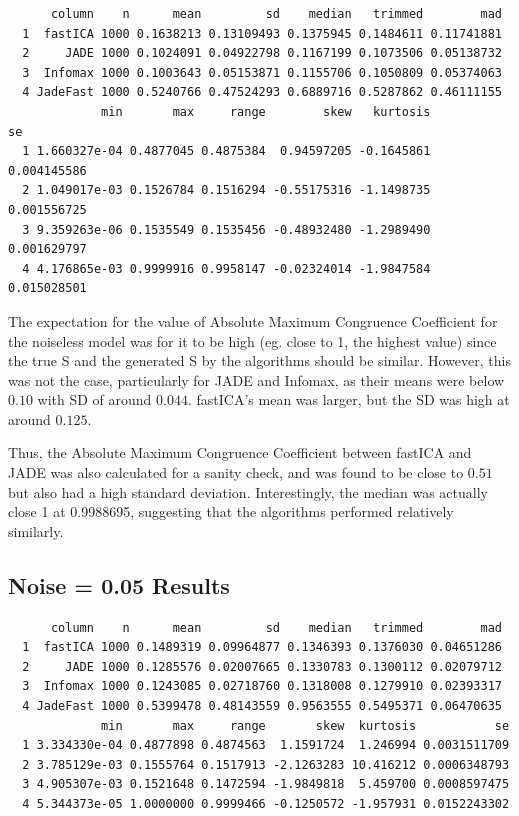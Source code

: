 \documentclass[12pt,twoside]{amherstthesis}
\begin{document}
  \begin{verbatim}
      column    n      mean         sd    median   trimmed        mad
  1  fastICA 1000 0.1638213 0.13109493 0.1375945 0.1484611 0.11741881
  2     JADE 1000 0.1024091 0.04922798 0.1167199 0.1073506 0.05138732
  3  Infomax 1000 0.1003643 0.05153871 0.1155706 0.1050809 0.05374063
  4 JadeFast 1000 0.5240766 0.47524293 0.6889716 0.5287862 0.46111155
             min       max     range        skew   kurtosis          se
  1 1.660327e-04 0.4877045 0.4875384  0.94597205 -0.1645861 0.004145586
  2 1.049017e-03 0.1526784 0.1516294 -0.55175316 -1.1498735 0.001556725
  3 9.359263e-06 0.1535549 0.1535456 -0.48932480 -1.2989490 0.001629797
  4 4.176865e-03 0.9999916 0.9958147 -0.02324014 -1.9847584 0.015028501
  \end{verbatim}
  
  The expectation for the value of Absolute Maximum Congruence Coefficient
  for the noiseless model was for it to be high (eg. close to 1, the
  highest value) since the true S and the generated S by the algorithms
  should be similar. However, this was not the case, particularly for JADE
  and Infomax, as their means were below \(0.10\) with SD of around
  \(0.044\). fastICA's mean was larger, but the SD was high at around
  \(0.125\).
  
  Thus, the Absolute Maximum Congruence Coefficient between fastICA and
  JADE was also calculated for a sanity check, and was found to be close
  to \(0.51\) but also had a high standard deviation. Interestingly, the
  median was actually close 1 at 0.9988695, suggesting that the algorithms
  performed relatively similarly.
  
  \subsection{Noise = 0.05 Results}\label{noise-0.05-results}
  
  \begin{verbatim}
      column    n      mean         sd    median   trimmed        mad
  1  fastICA 1000 0.1489319 0.09964877 0.1346393 0.1376030 0.04651286
  2     JADE 1000 0.1285576 0.02007665 0.1330783 0.1300112 0.02079712
  3  Infomax 1000 0.1243085 0.02718760 0.1318008 0.1279910 0.02393317
  4 JadeFast 1000 0.5399478 0.48143559 0.9563555 0.5495371 0.06470635
             min       max     range       skew  kurtosis           se
  1 3.334330e-04 0.4877898 0.4874563  1.1591724  1.246994 0.0031511709
  2 3.785129e-03 0.1555764 0.1517913 -2.1263283 10.416212 0.0006348793
  3 4.905307e-03 0.1521648 0.1472594 -1.9849818  5.459700 0.0008597475
  4 5.344373e-05 1.0000000 0.9999466 -0.1250572 -1.957931 0.0152243302
  \end{verbatim}
  
\end{document}
